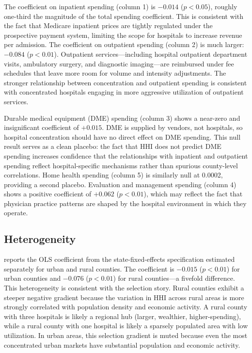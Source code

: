 \documentclass[12pt]{article}
\begin{document}
The coefficient on inpatient spending (column 1) is $-0.014$ ($p < 0.05$), roughly one-third the magnitude of the total spending coefficient. This is consistent with the fact that Medicare inpatient prices are tightly regulated under the prospective payment system, limiting the scope for hospitals to increase revenue per admission. The coefficient on outpatient spending (column 2) is much larger: $-0.084$ ($p < 0.01$). Outpatient services---including hospital outpatient department visits, ambulatory surgery, and diagnostic imaging---are reimbursed under fee schedules that leave more room for volume and intensity adjustments. The stronger relationship between concentration and outpatient spending is consistent with concentrated hospitals engaging in more aggressive utilization of outpatient services.

Durable medical equipment (DME) spending (column 3) shows a near-zero and insignificant coefficient of $+0.015$. DME is supplied by vendors, not hospitals, so hospital concentration should have no direct effect on DME spending. This null result serves as a clean placebo: the fact that HHI does not predict DME spending increases confidence that the relationships with inpatient and outpatient spending reflect hospital-specific mechanisms rather than spurious county-level correlations. Home health spending (column 5) is similarly null at 0.0002, providing a second placebo. Evaluation and management spending (column 4) shows a positive coefficient of $+0.062$ ($p < 0.01$), which may reflect the fact that physician practice patterns are shaped by the hospital environment in which they operate.



\subsection{Heterogeneity}

 reports the OLS coefficient from the state-fixed-effects specification estimated separately for urban and rural counties. The coefficient is $-0.015$ ($p < 0.01$) for urban counties and $-0.076$ ($p < 0.01$) for rural counties---a fivefold difference. This heterogeneity is consistent with the selection story. Rural counties exhibit a steeper negative gradient because the variation in HHI across rural areas is more strongly correlated with population density and economic activity. A rural county with three hospitals is likely a regional hub (larger, wealthier, higher-spending), while a rural county with one hospital is likely a sparsely populated area with low utilization. In urban areas, this selection gradient is muted because even the most concentrated urban markets have substantial population and economic activity.
\end{document}

